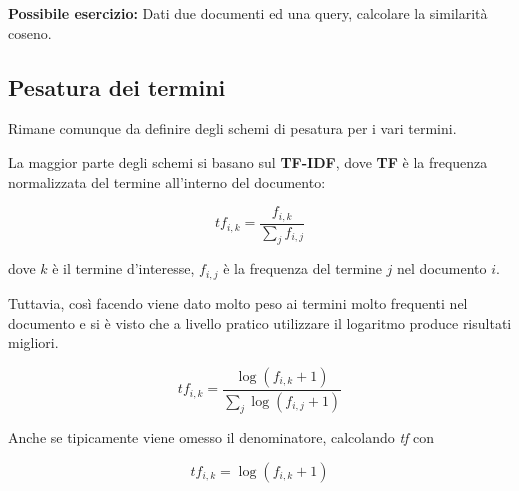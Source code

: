 \textbf{{\color{Red} Possibile esercizio:}} Dati due documenti ed una query, calcolare la similarità coseno.

\subsection{Pesatura dei termini}

Rimane comunque da definire degli schemi di pesatura per i vari termini.

La maggior parte degli schemi si basano sul \textbf{TF-IDF}, dove \textbf{TF} è la frequenza normalizzata del termine all'interno del documento:

$$
tf_{i,k} = \frac{f_{i,k}}{\sum\limits_j f_{i,j}}
$$

\noindent dove $k$ è il termine d'interesse, $f_{i,j}$ è la frequenza del termine $j$ nel documento $i$.

Tuttavia, così facendo viene dato molto peso ai termini molto frequenti nel documento e si è visto che a livello pratico utilizzare il logaritmo produce risultati migliori.

$$
tf_{i,k} = \frac{\log (f_{i,k}+1)}{\sum\limits_j \log (f_{i,j} +1)}
$$

Anche se tipicamente viene omesso il denominatore, calcolando \textit{tf} con

$$
tf_{i,k} = \log (f_{i,k}+1)
$$
